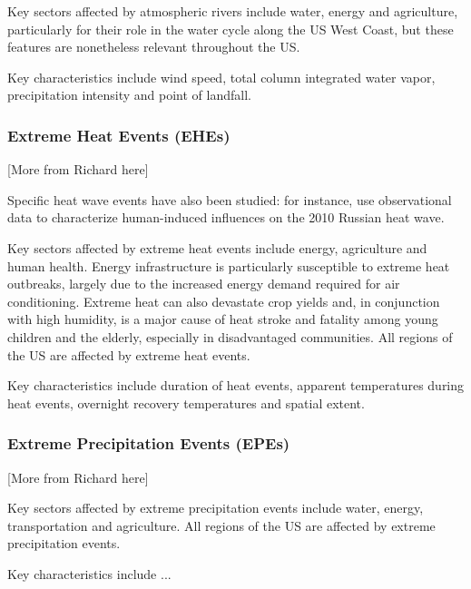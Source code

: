 \documentclass[11pt]{article}
\begin{document}


Key sectors affected by atmospheric rivers include water, energy and agriculture, particularly for their role in the water cycle along the US West Coast, but these features are nonetheless relevant throughout the US.

Key characteristics include wind speed, total column integrated water vapor, precipitation intensity and point of landfall.

\subsubsection*{Extreme Heat Events (EHEs)}

{\color{red}[More from Richard here]}

Specific heat wave events have also been studied:  for instance, \cite{dole2011grl} use observational data to characterize human-induced influences on the 2010 Russian heat wave.  

Key sectors affected by extreme heat events include energy, agriculture and human health.  Energy infrastructure is particularly susceptible to extreme heat outbreaks, largely due to the increased energy demand required for air conditioning.  Extreme heat can also devastate crop yields and, in conjunction with high humidity, is a major cause of heat stroke and fatality among young children and the elderly, especially in disadvantaged communities.  All regions of the US are affected by extreme heat events.

Key characteristics include duration of heat events, apparent temperatures during heat events, overnight recovery temperatures and spatial extent.

\subsubsection*{Extreme Precipitation Events (EPEs)}

{\color{red}[More from Richard here]}

Key sectors affected by extreme precipitation events include water, energy, transportation and agriculture.  All regions of the US are affected by extreme precipitation events.

Key characteristics include ...
\end{document}
